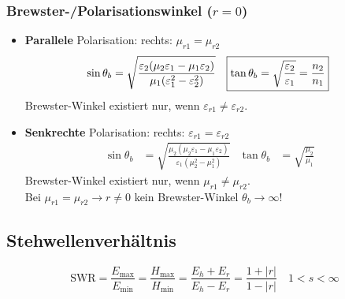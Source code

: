 \subsubsection[Brewster-/Polarisationswinkel]{Brewster-/Polarisationswinkel ($r=0$)}
\begin{itemize}
	\item \textbf{Parallele} Polarisation: \quad rechts:
	      $ \mu_{r1}=\mu_{r2} $
	      \begin{align*}
		      \sin\theta_b         & = \sqrt{\frac{\varepsilon_2(\mu_2\varepsilon_1 - \mu_1\varepsilon_2)}{\mu_1(\varepsilon_1^2-\varepsilon_2^2)}} &
		      \Aboxed{\tan\theta_b & = \sqrt{\frac{\varepsilon_2}{\varepsilon_1}} = \frac{n_2}{n_1}}                                                &
	      \end{align*}
	      Brewster-Winkel existiert nur, wenn $ \varepsilon_{r1} \neq \varepsilon_{r2} $.
	\item \textbf{Senkrechte} Polarisation:  \quad rechts: $ \varepsilon_{r1} = \varepsilon_{r2} $
	      \begin{align*}
		      \sin\theta_b & = \sqrt{\frac{\mu_2(\mu_2\varepsilon_1 - \mu_1\varepsilon_2)}{\varepsilon_1(\mu_2^2-\mu_1^2)}} &
		      \tan\theta_b & = \sqrt{\frac{\mu_2}{\mu_1}}                                                                   &
	      \end{align*}
	      Brewster-Winkel existiert nur, wenn $ \mu_{r1} \neq \mu_{r2} $.\\
	      Bei $ \mu_{r1}=\mu_{r2} \rightarrow r \neq 0$ \qquad kein Brewster-Winkel $\theta_b \rightarrow \infty$!
\end{itemize}

\subsection{Stehwellenverhältnis}
\[
    \mathrm{SWR} = \frac{E_{\max}}{E_{\min}}=\frac{H_{\max}}{H_{\min}}=\frac{E_{h}+E_{r}}{E_{h}-E_{r}} = \frac{1+|r|}{1-|r|} \quad 1<s<\infty
\]

